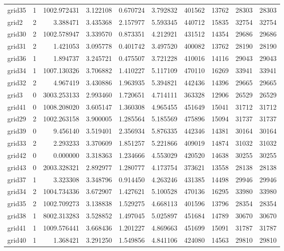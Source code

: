 \begin{longtable}{|l|r|r|r|r|r|r|r|r|r|}
grid35 & 1 & 1002.972431 & 3.122108 & 0.670724 & 3.792832 & 401562 & 13762 & 28303 & 28303 \\
grid2 & 2 & 3.388471 & 3.435368 & 2.157977 & 5.593345 & 440712 & 15835 & 32754 & 32754 \\
grid30 & 2 & 1002.578947 & 3.339570 & 0.873351 & 4.212921 & 431512 & 14354 & 29686 & 29686 \\
grid31 & 2 & 1.421053 & 3.095778 & 0.401742 & 3.497520 & 400082 & 13762 & 28190 & 28190 \\
grid36 & 1 & 1.894737 & 3.245721 & 0.475507 & 3.721228 & 410016 & 14116 & 29043 & 29043 \\
grid34 & 1 & 1007.130326 & 3.706882 & 1.410227 & 5.117109 & 470110 & 16269 & 33941 & 33941 \\
grid32 & 2 & 4.967419 & 3.430886 & 1.963935 & 5.394821 & 442436 & 14396 & 29665 & 29665 \\
grid3 & 0 & 3003.253133 & 2.993460 & 1.720651 & 4.714111 & 363328 & 12906 & 26529 & 26529 \\
grid41 & 0 & 1008.208020 & 3.605147 & 1.360308 & 4.965455 & 451649 & 15041 & 31712 & 31712 \\
grid29 & 2 & 1002.263158 & 3.900005 & 1.285564 & 5.185569 & 475896 & 15094 & 31737 & 31737 \\
grid39 & 0 & 9.456140 & 3.519401 & 2.356934 & 5.876335 & 442346 & 14381 & 30164 & 30164 \\
grid33 & 2 & 2.293233 & 3.370609 & 1.851257 & 5.221866 & 409019 & 14874 & 31032 & 31032 \\
grid42 & 0 & 0.000000 & 3.318363 & 1.234666 & 4.553029 & 420520 & 14638 & 30255 & 30255 \\
grid43 & 0 & 2003.328321 & 2.892977 & 1.280777 & 4.173754 & 373621 & 13558 & 28138 & 28138 \\
grid37 & 1 & 3.323308 & 3.348796 & 0.914450 & 4.263246 & 431385 & 14498 & 29946 & 29946 \\
grid34 & 2 & 1004.734336 & 3.672907 & 1.427621 & 5.100528 & 470136 & 16295 & 33980 & 33980 \\
grid35 & 2 & 1002.709273 & 3.138838 & 1.529275 & 4.668113 & 401596 & 13796 & 28354 & 28354 \\
grid38 & 1 & 8002.313283 & 3.528852 & 1.497045 & 5.025897 & 451684 & 14789 & 30670 & 30670 \\
grid41 & 1 & 1009.576441 & 3.668436 & 1.201227 & 4.869663 & 451699 & 15091 & 31787 & 31787 \\
grid40 & 1 & 1.368421 & 3.291250 & 1.549856 & 4.841106 & 424080 & 14563 & 29810 & 29810 \\

\end{longtable}
